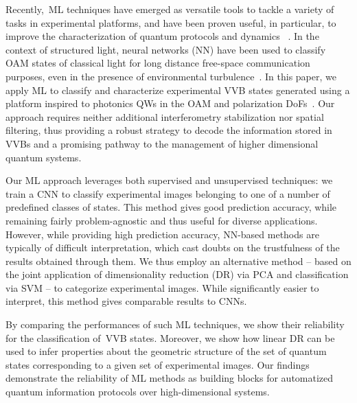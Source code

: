  Recently,~\ac{ML} techniques have emerged as versatile tools to tackle a variety of tasks in experimental platforms, and have been proven useful, in particular, to improve the characterization of quantum protocols and dynamics ~\cite{carrasquilla2019reconstructing,giordani2018experimental,agresti2019pattern,lumino2018experimental,rocchetto2019experimental,butler2018machine,fischer2006predicting,melnikov2018active,wang2017experimental}.
In the context of structured light, %
neural networks (NN) have been used to classify \ac{OAM} states of classical light for long distance free-space communication purposes, even in the presence of environmental turbulence~\cite{krenn2014communication,krenn2016twisted,doster2017machine,
park2018demultiplexing, lohani2018turbulence, li2018joint}.
In this paper, we apply \ac{ML} to classify and characterize experimental \ac{VVB} states generated using a platform inspired  to photonics \acp{QW} in the \ac{OAM} and polarization DoFs~\cite{innocenti2017quantum,giordani2019experimental}. {Our approach requires neither additional interferometry stabilization nor spatial filtering, thus providing a robust strategy to decode the information stored in \acp{VVB} and a promising pathway to the management of higher dimensional quantum systems}. 

Our \ac{ML} approach leverages both supervised and unsupervised techniques: we  train a \ac{CNN} to classify experimental images belonging to one of a number of predefined classes of states. This method gives good prediction accuracy, while remaining fairly problem-agnostic and thus useful for diverse applications. However, while providing high prediction accuracy, NN-based methods are typically of difficult interpretation, which cast doubts on the trustfulness of the results obtained through them. We thus employ an alternative method -- based on the joint application of dimensionality reduction (DR) via \ac{PCA} and classification via \ac{SVM} -- to categorize experimental images. While significantly easier to interpret, this method gives comparable results to \acp{CNN}.

By comparing the performances of such \ac{ML} techniques, we show their reliability for the classification of~\ac{VVB} states. Moreover, we show how linear DR can be used to infer properties about the geometric structure of the set of quantum states corresponding to a given set of experimental images.
Our findings demonstrate the reliability of \ac{ML} methods as building blocks for automatized quantum information protocols over high-dimensional systems. 

